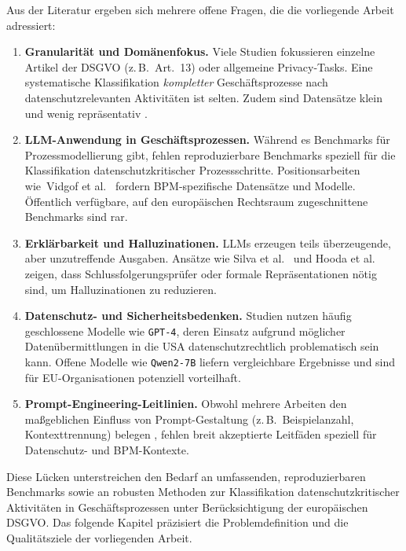 Aus der Literatur ergeben sich mehrere offene Fragen, die die vorliegende Arbeit adressiert:

\begin{enumerate}
    \item \textbf{Granularität und Domänenfokus.} Viele Studien fokussieren einzelne Artikel der \ac{DSGVO} (z.\,B.\ Art.~13) oder allgemeine Privacy-Tasks. Eine systematische Klassifikation \emph{kompletter} Geschäftsprozesse nach datenschutzrelevanten Aktivitäten ist selten. Zudem sind Datensätze klein und wenig repräsentativ \cite{nake2023towards}.
    \item \textbf{\ac{LLM}-Anwendung in Geschäftsprozessen.} Während es Benchmarks für Prozessmodellierung gibt, fehlen reproduzierbare Benchmarks speziell für die Klassifikation datenschutzkritischer Prozessschritte. Positionsarbeiten wie\linebreak~Vidgof et al.\ \cite{vidgof2023largelanguagemodelsbusiness} fordern \ac{BPM}-spezifische Datensätze und Modelle. Öffentlich verfügbare, auf den europäischen Rechtsraum zugeschnittene Benchmarks sind rar.
    \item \textbf{Erklärbarkeit und Halluzinationen.} \acp{LLM} erzeugen teils überzeugende, aber unzutreffende Ausgaben. Ansätze wie Silva et al.\ \cite{silva2024entailment} und Hooda et al.\ \cite{hooda2024policylr} zeigen, dass Schlussfolgerungsprüfer oder formale Repräsentationen nötig sind, um Halluzinationen zu reduzieren.
    \item \textbf{Datenschutz- und Sicherheitsbedenken.} Studien nutzen häufig geschlossene Modelle wie \texttt{GPT-4}, deren Einsatz aufgrund möglicher Datenübermittlungen in die USA datenschutzrechtlich problematisch sein kann. Offene Modelle wie \texttt{Qwen2-7B} liefern vergleichbare Ergebnisse \cite{schwerin2024systematic} und sind für \ac{EU}-Organisationen potenziell vorteilhaft.
    \item \textbf{Prompt-Engineering-Leitlinien.} Obwohl mehrere Arbeiten den maßgeblichen Einfluss von Prompt-Gestaltung (z.\,B.\ Beispielanzahl, Kontexttrennung) belegen \cite{liu2023prompting,pragyan2024toward}, fehlen breit akzeptierte Leitfäden speziell für Datenschutz- und \ac{BPM}-Kontexte.
\end{enumerate}

Diese Lücken unterstreichen den Bedarf an umfassenden, reproduzierbaren Benchmarks sowie an robusten Methoden zur Klassifikation datenschutzkritischer Aktivitäten in Geschäftsprozessen unter Berücksichtigung der europäischen \ac{DSGVO}. Das folgende Kapitel präzisiert die Problemdefinition und die Qualitätsziele der vorliegenden Arbeit.
